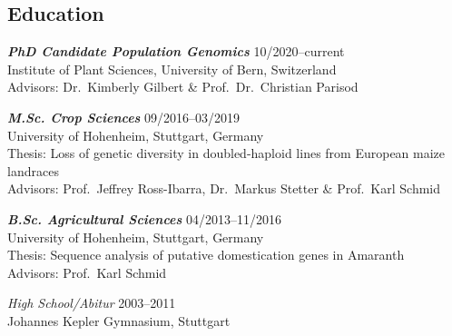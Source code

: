\documentclass[margin,10pt,a4paper]{res}
\begin{document}
\begin{resume}

\section{Education}

\textbf{\textit{PhD Candidate Population Genomics}} \hfill 10/2020--current \\
Institute of Plant Sciences, University of Bern, Switzerland \\
Advisors: Dr.~Kimberly Gilbert \& Prof.~Dr.~Christian Parisod


\textbf{\textit{M.Sc. Crop Sciences}} \hfill 09/2016--03/2019 \\
University of Hohenheim, Stuttgart, Germany \\
Thesis: Loss of genetic diversity in doubled-haploid lines from European maize landraces \\
Advisors: Prof.~Jeffrey Ross-Ibarra, Dr.~Markus Stetter \& Prof.~Karl Schmid


\textbf{\textit{B.Sc. Agricultural Sciences}} \hfill 04/2013--11/2016 \\
University of Hohenheim, Stuttgart, Germany\\
Thesis: Sequence analysis of putative domestication genes in Amaranth\\
Advisors: Prof.~Karl Schmid

{\sl High School/Abitur} \hfill 2003--2011 \\
Johannes Kepler Gymnasium, Stuttgart

 

\end{resume}
\end{document}
